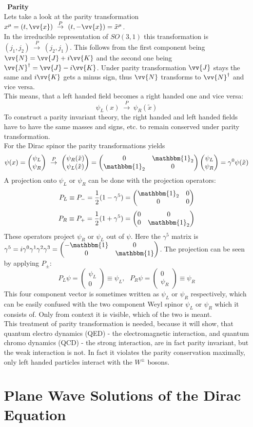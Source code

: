 \documentclass{include/thesisclass}
\newcommand{\vx}{\vv{x}}
\newcommand{\df}{\rightarrow}
\newcommand{\ehm}{\mathbbm{1}}
\newcommand{\vektorz}[2]{\begin{pmatrix} #1 \\ #2 \end{pmatrix}}
\newcommand{\Matz}[4]{\begin{pmatrix}#1&#2\\#3&#4\end{pmatrix}}
\newcommand{\sub}[1]{~\newline\newline\textbf{#1}\\}
\begin{document}
\sub{Parity}
Lets take a look at the parity transformation $x^\mu = (t, \vx) ~\overset{P}{\df}~ (t, - \vx) = \tilde{x}^\mu$.\\
In the irreducible representation of $SO(3,1)$ this transformation is $(j_1, j_2)~\overset{P}{\df}~ (j_2, j_1)$. This follows from the first component being $\vv{N} = \vv{J} + i \vv{K}$ and the second one being $\vv{N}^\dagger = \vv{J} - i \vv{K}$. Under parity transformation $\vv{J}$ stays the same and $i\vv{K}$ gets a minus sign, thus $\vv{N}$ transforms to $\vv{N}^\dagger$ and vice versa.\\
This means, that a left handed field becomes a right handed one and vice versa:
\[\psi_L(x) ~\overset{P}{\df}~ \psi_R(\tilde{x})\]
To construct a parity invariant theory, the right handed and left handed fields have to have the same masses and signs, etc. to remain conserved under parity transformation.\\
For the Dirac spinor the parity transformations yields
\[ \psi(x) = \vektorz{\psi_L}{\psi_R} ~\overset{P}{\df}~ \vektorz{\psi_R(\tilde{x})}{\psi_L(\tilde{x})} = \Matz{0}{\ehm_2}{\ehm_2}{0} \vektorz{\psi_L}{\psi_R} = \gamma^0 \psi(\tilde{x})\]
A projection onto $\psi_L$ or $\psi_R$ can be done with the projection operators:
\[ P_L \equiv P_- = \frac{1}{2} ( 1 - \gamma^5) = \Matz{\ehm_2}{0}{0}{0}\]
\[ P_R \equiv P_+ = \frac{1}{2} ( 1 + \gamma^5) = \Matz{0}{0}{0}{\ehm_2}\]
These operators project $\psi_R$ or $\psi_L$ out of $\psi$. Here the $\gamma^5$ matrix is $\gamma^5 = i \gamma^0 \gamma^1\gamma^2\gamma^3 = \Matz{-\ehm}{0}{0}{\ehm}$. The projection can be seen by applying $P_\pm$:
\[P_L\psi = \vektorz{\psi_L}{0} \equiv \psi_L, ~~~ P_R \psi = \vektorz{0}{\psi_R} \equiv \psi_R\]
This four component vector is sometimes written as $\psi_L$ or $\psi_R$ respectively, which can be easily confused with the two component Weyl spinor $\psi_L$ or $\psi_R$ which it consists of. Only from context it is visible, which of the two is meant.\\
This treatment of parity transformation is needed, because it will show, that quantum electro dynamics (QED) - the electromagnetic interaction, and quantum chromo dynamics (QCD) - the strong interaction, are in fact parity invariant, but the weak interaction is not. In fact it violates the parity conservation maximally, only left handed particles interact with the $W^\pm$ bosons.

\section{Plane Wave Solutions of the Dirac Equation}
\end{document}
